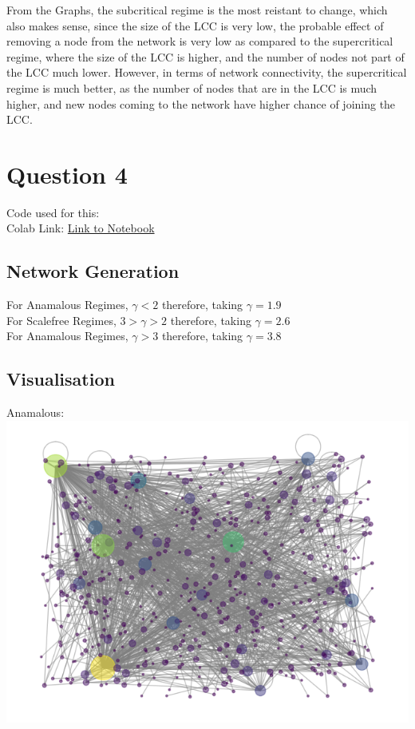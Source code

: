 \documentclass[11pt]{article}
\begin{document}
From the Graphs, the subcritical regime is the most reistant to change, which also makes sense, since the size of the LCC is very low, the probable effect of removing a node from the network is very low as compared to the supercritical regime, where the size of the LCC is higher, and the number of nodes not part of the LCC much lower. However, in terms of network connectivity, the supercritical regime is much better, as the number of nodes that are in the LCC is much higher, and new nodes coming to the network have higher chance of joining the LCC.

\section{Question 4}
Code used for this:\\ 
Colab Link: \href{https://colab.research.google.com/drive/1IO6M2aksI1LgTy-kVjHkXarPsqFt2RmS?usp=sharing}{Link to Notebook} \\

\subsection{Network Generation}
For Anamalous Regimes, $\gamma < 2$ therefore, taking $\gamma = 1.9$ \\ 
For Scalefree Regimes, $3 > \gamma > 2$ therefore, taking $\gamma = 2.6$ \\ 
For Anamalous Regimes, $\gamma > 3$ therefore, taking $\gamma = 3.8$ 
\subsection{Visualisation}
Anamalous: \\
\includegraphics[scale=0.5]{gvanam.png}
\end{document}
